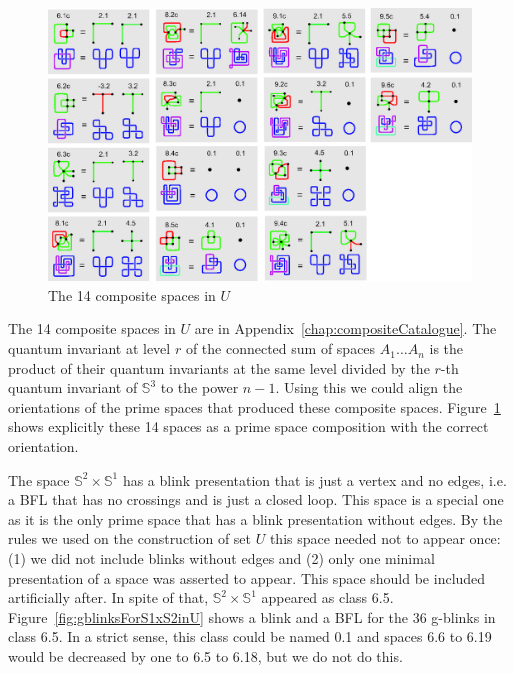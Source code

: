 \begin{figure}[h!tp]
   \begin{center}
      \leavevmode
      \includegraphics[width=16cm]{A.figs/compositespaces.eps}
   \end{center}
   \vspace{-0.7cm}
   \caption{ The 14 composite spaces in $U$}
   \label{fig:compositeSpaces}
\end{figure}

The 14 composite spaces in $U$ are in Appendix~\ref{chap:compositeCatalogue}.
The quantum invariant at level $r$ of the connected sum of spaces $A_1 \ldots A_n$ is the product
of their quantum invariants at the same level divided by the $r$-th quantum invariant of $\mathbb{S}^3$ to
the power $n-1$. Using this we could align the orientations of the prime spaces that
produced these composite spaces. Figure~\ref{fig:compositeSpaces} shows explicitly these
14 spaces as a prime space composition with the correct orientation.

The space $\mathbb{S}^2 \times \mathbb{S}^1$ has a blink presentation that is just a vertex
and no edges, i.e. a BFL that has no crossings and is just a closed loop. This
space is a special one as it is the only prime space that has a blink presentation
without edges. By the rules we used on the construction of set $U$ this space
needed not to appear once: (1) we did not include blinks without edges and
(2) only one minimal presentation of a space was asserted to appear. This
space should be included artificially after. In spite of that, $\mathbb{S}^2 \times \mathbb{S}^1$
appeared as class 6.5. Figure~\ref{fig:gblinksForS1xS2inU} shows a blink
and a BFL for the 36 g-blinks in class 6.5. In a strict sense, this class
could be named 0.1 and spaces 6.6 to 6.19 would be decreased by one to 6.5
to 6.18, but we do not do this.

